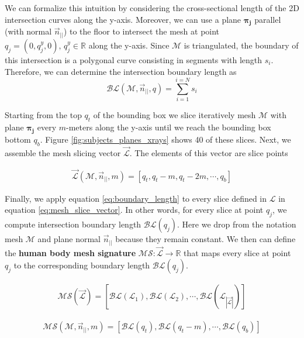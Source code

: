 \documentclass[runningheads, orivec]{llncs}
\begin{document}
We 
can formalize this intuition by considering the cross-sectional length of the 
2D intersection curves along the y-axis. Moreover, we 
can 
use a plane $\boldsymbol{\pi_j}$ parallel (with normal $\vec{n}_{||}$) to the 
floor to intersect the mesh at point $q_j = (0, q^y_j, 0), \,  q^y_j \in 
\mathbb{R}$ along the y-axis. Since $\mathcal{M}$ is triangulated, the boundary 
of this 
intersection is a polygonal curve consisting in segments with length $s_i$. 
Therefore, we 
can 
determine the intersection boundary length as
\begin{equation}\label{eq:boundary_length}
\mathcal{BL}(\mathcal{M}, \vec{n}_{||}, q) = \sum_{i = 
	1}^{i = N}s_i
\end{equation}

Starting 
from the 
top $q_t$ of the bounding box we slice iteratively mesh $\mathcal{M}$ with 
plane 
$\boldsymbol{\pi_j}$ every $m$-meters along the y-axis until we reach the 
bounding box bottom 
$q_b$. Figure \ref{fig:subjects_planes_xrays} shows 40 of these 
slices. Next, we assemble the mesh slicing vector $\vec{\mathcal{L}}$. The 
elements of 
this vector are slice points

\begin{align}\label{eq:mesh_slice_vector}
\vec{\mathcal{L}}(\mathcal{M}, \vec{n}_{||}, m) = \left[ q_t, q_t-m, q_t-2 
m,\cdots, 
q_b \right]
\end{align}

Finally, we apply equation \ref{eq:boundary_length} to every slice defined in
$\mathcal{L}$ in equation \ref{eq:mesh_slice_vector}. In other words, for every 
slice at point 
$q_j$, we compute intersection boundary length $\mathcal{BL}(q_j)$. Here we 
drop from the notation mesh 
$\mathcal{M}$ and plane normal $\vec{n}_{||}$ because they remain constant. We 
then can 
define the \textbf{human body mesh signature} $\mathcal{MS}: 
\vec{\mathcal{L}} \to \mathbb{R}$ that maps every slice at point $q_j$ to the 
corresponding boundary length $\mathcal{BL}(q_j)$.

\begin{align}\label{eq:mesh_signature_short}
\mathcal{MS}(\vec{\mathcal{L}}) = [\mathcal{BL}(\mathcal{L}_1), 
\mathcal{BL}(\mathcal{L}_2), \cdots, 
\mathcal{BL}(\mathcal{L}_{|\vec{\mathcal{L}}|})]
\end{align}

\begin{align}\label{eq:mesh_signature}
\mathcal{MS}(\mathcal{M}, \vec{n}_{||}, m) = 
[\mathcal{BL}(q_t), \mathcal{BL}(q_t-m), \cdots, \mathcal{BL}(q_b)]
\end{align}
\end{document}
